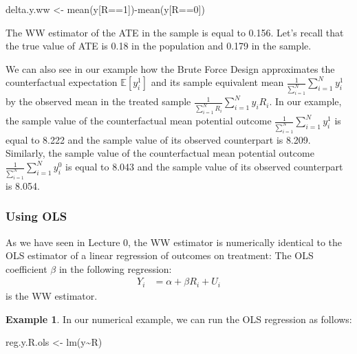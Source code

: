\documentclass[
]{book}
\newenvironment{Shaded}{\begin{snugshade}}{\end{snugshade}}
\newcommand{\DecValTok}[1]{\textcolor[rgb]{0.00,0.00,0.81}{#1}}
\newcommand{\FunctionTok}[1]{\textcolor[rgb]{0.00,0.00,0.00}{#1}}
\newcommand{\NormalTok}[1]{#1}
\newcommand{\OtherTok}[1]{\textcolor[rgb]{0.56,0.35,0.01}{#1}}
\newcommand{\SpecialCharTok}[1]{\textcolor[rgb]{0.00,0.00,0.00}{#1}}
\newcommand{\esp}[1]{\mathbb{E}[ #1 ]}
\theoremstyle{definition}
\theoremstyle{definition}
\newtheorem{example}{Example}[chapter]
\theoremstyle{definition}
\theoremstyle{definition}
\theoremstyle{remark}
\begin{document}
\begin{Shaded}
\begin{Highlighting}[]
\NormalTok{delta.y.ww }\OtherTok{\textless{}{-}} \FunctionTok{mean}\NormalTok{(y[R}\SpecialCharTok{==}\DecValTok{1}\NormalTok{])}\SpecialCharTok{{-}}\FunctionTok{mean}\NormalTok{(y[R}\SpecialCharTok{==}\DecValTok{0}\NormalTok{])}
\end{Highlighting}
\end{Shaded}

The WW estimator of the ATE in the sample is equal to 0.156.
Let's recall that the true value of ATE is 0.18 in the population and 0.179 in the sample.

We can also see in our example how the Brute Force Design approximates the counterfactual expectation \(\esp{y_i^1}\) and its sample equivalent mean \(\frac{1}{\sum_{i=1}^N}\sum_{i=1}^N y^1_i\) by the observed mean in the treated sample \(\frac{1}{\sum_{i=1}^N R_i}\sum_{i=1}^N y_iR_i\).
In our example, the sample value of the counterfactual mean potential outcome \(\frac{1}{\sum_{i=1}^N}\sum_{i=1}^N y^1_i\) is equal to 8.222 and the sample value of its observed counterpart is 8.209.
Similarly, the sample value of the counterfactual mean potential outcome \(\frac{1}{\sum_{i=1}^N}\sum_{i=1}^N y^0_i\) is equal to 8.043 and the sample value of its observed counterpart is 8.054.

\hypertarget{using-ols}{%
\subsubsection{Using OLS}\label{using-ols}}

As we have seen in Lecture 0, the WW estimator is numerically identical to the OLS estimator of a linear regression of outcomes on treatment:
The OLS coefficient \(\beta\) in the following regression:
\begin{align*}
    Y_i &  = \alpha +  \beta R_i + U_i
    \end{align*}
is the WW estimator.

\begin{example}
\protect\hypertarget{exm:unnamed-chunk-71}{}{\label{exm:unnamed-chunk-71} }In our numerical example, we can run the OLS regression as follows:
\end{example}

\begin{Shaded}
\begin{Highlighting}[]
\NormalTok{reg.y.R.ols }\OtherTok{\textless{}{-}} \FunctionTok{lm}\NormalTok{(y}\SpecialCharTok{\textasciitilde{}}\NormalTok{R)}
\end{Highlighting}
\end{Shaded}
\end{document}
